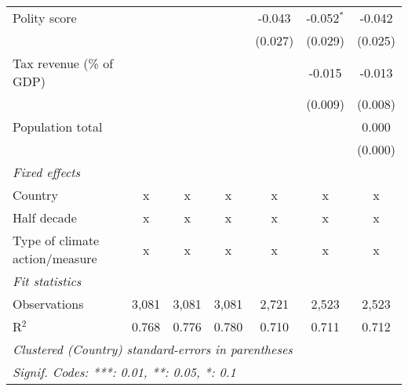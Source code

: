 \begin{tabular}{lcccccc}
   Polity score                                                      &               &                &                & -0.043         & -0.052$^{*}$   & -0.042\\   
                                                                     &               &                &                & (0.027)        & (0.029)        & (0.025)\\   
   Tax revenue (\% of GDP)                                           &               &                &                &                & -0.015         & -0.013\\   
                                                                     &               &                &                &                & (0.009)        & (0.008)\\   
   Population total                                                  &               &                &                &                &                & 0.000\\   
                                                                     &               &                &                &                &                & (0.000)\\   
   \emph{Fixed effects}\\
   Country                                                           & x             & x              & x              & x              & x              & x\\  
   Half decade                                                       & x             & x              & x              & x              & x              & x\\  
   Type of climate action/measure                                    & x             & x              & x              & x              & x              & x\\  
   \midrule \emph{Fit statistics}\\
   Observations                                                      & 3,081         & 3,081          & 3,081          & 2,721          & 2,523          & 2,523\\  
   R$^2$                                                             & 0.768         & 0.776          & 0.780          & 0.710          & 0.711          & 0.712\\  
   \midrule
   \multicolumn{7}{l}{\emph{Clustered (Country) standard-errors in parentheses}}\\
   \multicolumn{7}{l}{\emph{Signif. Codes: ***: 0.01, **: 0.05, *: 0.1}}\\
\end{tabular}
\par\endgroup


